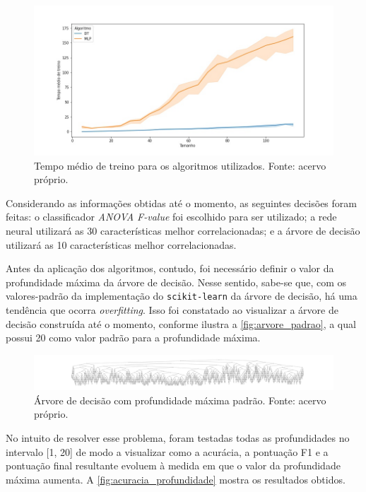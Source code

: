 \documentclass[12pt]{article}
\begin{document}
\begin{figure}[t!]
    \includegraphics[width=\linewidth]{figures/tempo_treino}
    \caption{Tempo médio de treino para os algoritmos utilizados. Fonte: acervo próprio.}
    \label{fig:tempo-treino}
\end{figure}

Considerando as informações obtidas até o momento, as seguintes decisões foram feitas: o classificador \textit{ANOVA F-value} foi escolhido para ser utilizado; a rede neural utilizará as 30 características melhor correlacionadas; e a árvore de decisão utilizará as 10 características melhor correlacionadas.

Antes da aplicação dos algoritmos, contudo, foi necessário definir o valor da profundidade máxima da árvore de decisão. Nesse sentido, sabe-se que, com os valores-padrão da implementação do \texttt{scikit-learn} da árvore de decisão, há uma tendência que ocorra \textit{overfitting}. Isso foi constatado ao visualizar a árvore de decisão construída até o momento, conforme ilustra a \autoref{fig:arvore_padrao}, a qual possui 20 como valor padrão para a profundidade máxima.

\begin{figure}[t!]
    \includegraphics[width=\linewidth]{figures/arvore_padrao}
    \caption{Árvore de decisão com profundidade máxima padrão. Fonte: acervo próprio.}
    \label{fig:arvore_padrao}
\end{figure}

No intuito de resolver esse problema, foram testadas todas as profundidades no intervalo [1, 20] de modo a visualizar como a acurácia, a pontuação F1 e a pontuação final resultante evoluem à medida em que o valor da profundidade máxima aumenta. A \autoref{fig:acuracia_profundidade} mostra os resultados obtidos. 
\end{document}
